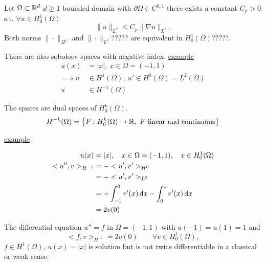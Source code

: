 \begin{theorem}
	Let $\Omega \subset \mathbb{R}^d$ $d\geq 1$ bounded domain with $\partial \Omega \in C^{0,1}$ there exists a constant $C_p > 0$ s.t. $\forall u\in H^1_0(\Omega)$
	\begin{equation*}
		\|u\|_{L^2} \leq C_p \|\nabla u\|_{L^2}.
	\end{equation*}
	Both norms $\|\cdot\|_{H^1}$ and $ \|\cdot\|_{L^2} $????? are equivalent in $H^1_0(\Omega)$?????.
\end{theorem}
 
There are also soboloev spaces with negative index.\enter
\underline{example}
\begin{align*}
	u(x) &= |x|, \ x\in \Omega = (-1,1)\\
	\implies u&\in H^1(\Omega),\ u' \in H^0(\Omega) = L^2(\Omega)\\
	u &\in H^{-1}(\Omega)
\end{align*}

The spaces are dual spaces of $H^k_0(\Omega)$.
\begin{equation*}
	H^{-k}(\Omega) = \big \{ F: H^k_0(\Omega) \to \mathbb{R},\  F \text{ linear and continuous} \big \}
\end{equation*}

\underline{example}

\begin{align*}
	u(x)&=|x|,\quad x \in \Omega = (-1,1), \quad v \in H^1_0(\Omega)\\
	<u'',v>_{H^{-1} } &= -<u',v'>_{H^0 }\\
					  &= -<u',v'>_{L^2} \\
					  &= +\int^0_{-1} v'(x) \mathop{}\!\mathrm{d} x - \int^1_0 v'(x) \mathop{}\!\mathrm{d} x\\
					  &= 2 v(0)
\end{align*}

The differential equation $u'' = f$ in $\Omega = (-1,1)$ with $u(-1)= u(1) =1$ and
\begin{equation*}
	<f,v>_{H^{-1} } = 2v(0)\qquad \forall v \in H^1_0(\Omega),
\end{equation*} 
$f \in H^1(\Omega)$, $u(x)=|x|$ is solution but is not twice differentiable in a classical or weak sense.


